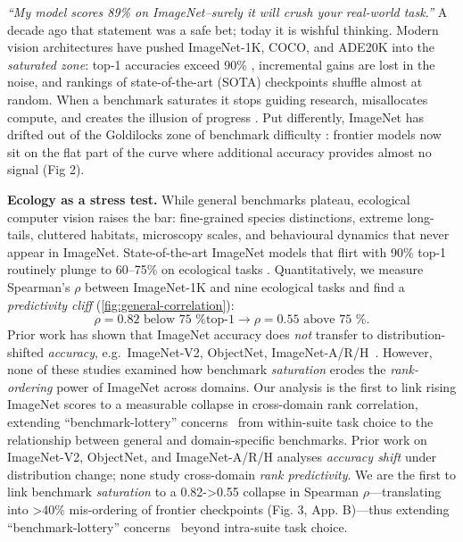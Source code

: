 \documentclass{article}
\begin{document}
\textit{``My model scores \num{89}\% on ImageNet--surely it will crush your real-world task.''}
A decade ago that statement was a safe bet; today it is wishful thinking.
Modern vision architectures have pushed ImageNet-1K, COCO, and ADE20K into the
\emph{saturated zone}: top-1 accuracies exceed \num{90}\% \citep{coca}, incremental gains are lost in the noise, and rankings of state-of-the-art (SOTA) checkpoints shuffle almost at random.
When a benchmark saturates it stops guiding research, misallocates compute, and creates the illusion of progress \citep{recht2019imagenet,beyer2020imagenet,paullada2021data}.
Put differently, ImageNet has drifted out of the Goldilocks zone of benchmark difficulty \citep[vibe-eval]{wang2024vibe}: frontier models now sit on the flat part of the curve where additional accuracy provides almost no signal (Fig 2).

\noindent\textbf{Ecology as a stress test.}
While general benchmarks plateau, ecological computer vision raises the bar: fine-grained species distinctions, extreme long-tails, cluttered habitats, microscopy scales, and behavioural dynamics that never appear in ImageNet.
State-of-the-art ImageNet models that flirt with \num{90}\% top-1 routinely plunge to
\num{60}–\num{75}\% on ecological tasks \citep{beery2018recognition,van2018inaturalist,schneider2023newt}.
Quantitatively, we measure Spearman’s $\rho$ between ImageNet-1K and nine ecological tasks and find a \emph{predictivity cliff} (\cref{fig:general-correlation}):
\[
\rho = 0.82 \text{ below 75 \% top-1} \longrightarrow \rho = 0.55 \text{ above 75 \%.}
\]
Prior work has shown that ImageNet accuracy does \emph{not} transfer to
distribution-shifted \emph{accuracy}, e.g.\ ImageNet-V2, ObjectNet,
ImageNet-A/R/H~\citep{recht2019imagenet,barbu2019objectnet,taori2020imagenetH,hendrycks2021imagenetR}.
However, none of these studies examined how benchmark \emph{saturation} erodes the \emph{rank-ordering} power of ImageNet across domains.
Our analysis is the first to link rising ImageNet scores to a measurable collapse in cross-domain rank correlation, extending ``benchmark-lottery'' concerns~\citep{ashmore2021benchmark} from within-suite task choice to the relationship between general and domain-specific benchmarks.
Prior work on ImageNet-V2, ObjectNet, and ImageNet-A/R/H analyses \emph{accuracy shift} under distribution change; none study cross-domain \emph{rank predictivity}.  
We are the first to link benchmark \emph{saturation} to a 0.82->0.55 collapse in Spearman $\rho$—translating into >40\% mis-ordering of frontier checkpoints (Fig. 3, App. B)—thus extending “benchmark-lottery” concerns~\citep{ashmore2021benchmark} beyond intra-suite task choice.
\end{document}

